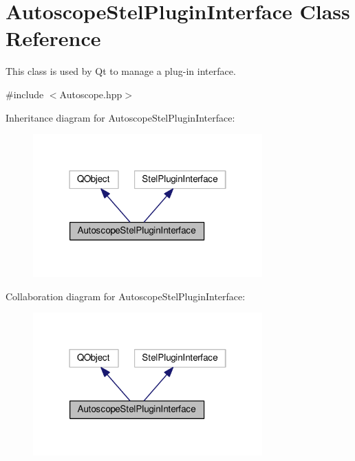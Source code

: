 \hypertarget{class_autoscope_stel_plugin_interface}{}\section{Autoscope\+Stel\+Plugin\+Interface Class Reference}
\label{class_autoscope_stel_plugin_interface}


This class is used by Qt to manage a plug-\/in interface.  




{\ttfamily \#include $<$Autoscope.\+hpp$>$}



Inheritance diagram for Autoscope\+Stel\+Plugin\+Interface\+:
\nopagebreak
\begin{figure}[H]
\begin{center}
\leavevmode
\includegraphics[width=250pt]{class_autoscope_stel_plugin_interface__inherit__graph}
\end{center}
\end{figure}


Collaboration diagram for Autoscope\+Stel\+Plugin\+Interface\+:
\nopagebreak
\begin{figure}[H]
\begin{center}
\leavevmode
\includegraphics[width=250pt]{class_autoscope_stel_plugin_interface__coll__graph}
\end{center}
\end{figure}
